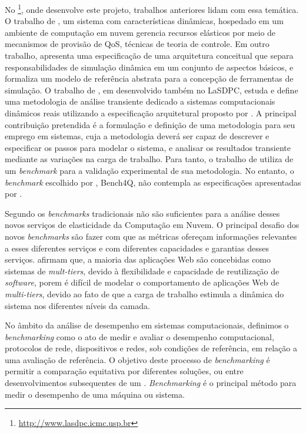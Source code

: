 No \textit{}\footnote{\url{http://www.lasdpc.icmc.usp.br}}, onde desenvolve este projeto, trabalhos anteriores lidam com essa temática. O trabalho de , um sistema com características dinâmicas, hospedado em um ambiente de computação em nuvem gerencia recursos elásticos por meio de mecanismos de provisão de QoS, técnicas de teoria de controle. Em outro trabalho,  apresenta uma especificação de uma arquitetura conceitual que separa responsabilidades de simulação dinâmica em um conjunto de aspectos básicos, e formaliza um modelo de referência abstrata para a concepção de ferramentas de simulação. O trabalho de , em desenvolvido também no LaSDPC, estuda e define uma metodologia de análise transiente dedicado a sistemas computacionais dinâmicos reais utilizando a especificação arquitetural proposto por . A principal contribuição pretendida é a formulação e definição de uma metodologia para seu emprego em sistemas, cuja a metodologia deverá ser capaz de descrever e especificar os passos para modelar o sistema, e analisar os resultados transiente mediante as variações na carga de trabalho. Para tanto, o trabalho de  utiliza de um \textit{benchmark} para a validação experimental de sua metodologia. No entanto, o \textit{benchmark} escolhido por , Bench4Q, não contempla as especificações apresentadas por .

Segundo  os \textit{benchmarks} tradicionais não são suficientes para a análise desses novos serviços de elasticidade da Computação em Nuvem. O principal desafio dos novos \textit{benchmarks} são fazer com que as métricas ofereçam informações relevantes a esses diferentes serviços e com diferentes capacidades e garantias desses serviços.  afirmam que, a maioria das aplicações Web são concebidas como sistemas de \textit{mult-tiers}, devido à flexibilidade e capacidade de reutilização de \textit{software}, porem é difícil de modelar o comportamento de aplicações Web de \textit{multi-tiers}, devido ao fato de que a carga de trabalho estimula a dinâmica do sistema nos diferentes níveis da camada.

No âmbito da análise de desempenho em sistemas computacionais, definimos o \textit{benchmarking} como o ato de medir e avaliar o desempenho computacional, protocolos de rede, dispositivos e redes, sob condições de referência, em relação a uma avaliação de referência. O objetivo deste processo de \textit{benchmarking} é permitir a comparação equitativa por diferentes soluções, ou entre desenvolvimentos subsequentes de um \textit{}. \textit{Benchmarking} é o principal método para medir o desempenho de uma máquina ou sistema.

